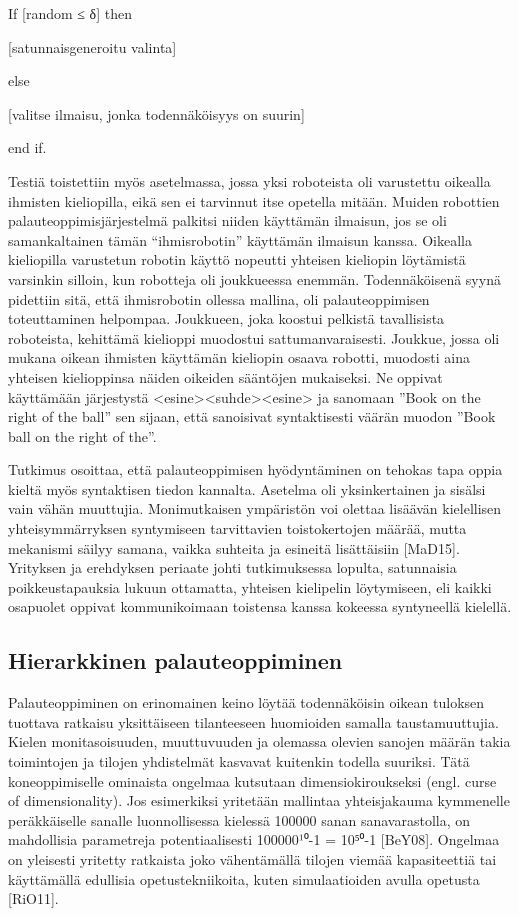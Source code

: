 \documentclass[finnish]{tktltiki2}
\theoremstyle{definition}
\theoremstyle{remark}
\begin{document}
If [random ≤ δ] then 
 
[satunnaisgeneroitu valinta] 
 
else 
 
[valitse ilmaisu, jonka todennäköisyys on suurin] 
 
end if. 
 
Testiä toistettiin myös asetelmassa, jossa yksi roboteista oli varustettu oikealla ihmisten kieliopilla, eikä sen ei tarvinnut itse opetella mitään. Muiden robottien palauteoppimisjärjestelmä palkitsi niiden käyttämän ilmaisun, jos se oli samankaltainen tämän “ihmisrobotin” käyttämän ilmaisun kanssa. Oikealla kieliopilla varustetun robotin käyttö nopeutti yhteisen kieliopin löytämistä varsinkin silloin, kun robotteja oli joukkueessa enemmän. Todennäköisenä syynä pidettiin sitä, että ihmisrobotin ollessa mallina, oli palauteoppimisen toteuttaminen helpompaa. Joukkueen, joka koostui pelkistä tavallisista roboteista, kehittämä kielioppi muodostui sattumanvaraisesti. Joukkue, jossa oli mukana oikean ihmisten käyttämän kieliopin osaava robotti, muodosti aina yhteisen kielioppinsa näiden oikeiden sääntöjen mukaiseksi. Ne oppivat käyttämään järjestystä <esine><suhde><esine> ja sanomaan ”Book on the right of the ball” sen sijaan, että sanoisivat syntaktisesti väärän muodon ”Book ball on the right of the”. 
 
Tutkimus osoittaa, että palauteoppimisen hyödyntäminen on tehokas tapa oppia kieltä myös syntaktisen tiedon kannalta. Asetelma oli yksinkertainen ja sisälsi vain vähän muuttujia. Monimutkaisen ympäristön voi olettaa lisäävän kielellisen yhteisymmärryksen syntymiseen tarvittavien toistokertojen määrää, mutta mekanismi säilyy samana, vaikka suhteita ja esineitä lisättäisiin [MaD15]. Yrityksen ja erehdyksen periaate johti tutkimuksessa lopulta, satunnaisia poikkeustapauksia lukuun ottamatta, yhteisen kielipelin löytymiseen, eli kaikki osapuolet oppivat kommunikoimaan toistensa kanssa kokeessa syntyneellä kielellä.

\subsection{Hierarkkinen palauteoppiminen}

Palauteoppiminen on erinomainen keino löytää todennäköisin oikean tuloksen tuottava ratkaisu yksittäiseen tilanteeseen huomioiden samalla taustamuuttujia. Kielen monitasoisuuden, muuttuvuuden ja olemassa olevien sanojen määrän takia toimintojen ja tilojen yhdistelmät kasvavat kuitenkin todella suuriksi. Tätä koneoppimiselle ominaista ongelmaa kutsutaan dimensiokiroukseksi (engl. curse of dimensionality). Jos esimerkiksi yritetään mallintaa yhteisjakauma kymmenelle peräkkäiselle sanalle luonnollisessa kielessä 100000 sanan sanavarastolla, on mahdollisia parametreja potentiaalisesti 100000¹⁰-1 = 10⁵⁰-1 [BeY08]. Ongelmaa on yleisesti yritetty ratkaista joko vähentämällä tilojen viemää kapasiteettiä tai käyttämällä edullisia opetustekniikoita, kuten simulaatioiden avulla opetusta [RiO11]. 
 
\end{document}
